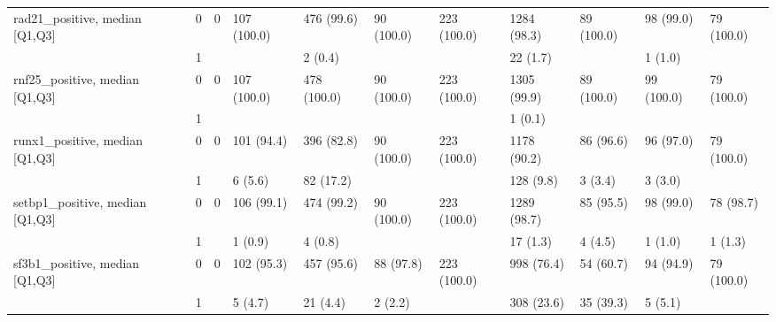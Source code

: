\begin{tabular}{lllllllllll}
rad21\_positive, median [Q1,Q3] & 0 &                    0 &         107 (100.0) &         476 (99.6) &           90 (100.0) &         223 (100.0) &       1284 (98.3) &        89 (100.0) &           98 (99.0) &           79 (100.0) \\
                 & 1 &                      &                     &            2 (0.4) &                      &                     &          22 (1.7) &                   &             1 (1.0) &                      \\
rnf25\_positive, median [Q1,Q3] & 0 &                    0 &         107 (100.0) &        478 (100.0) &           90 (100.0) &         223 (100.0) &       1305 (99.9) &        89 (100.0) &          99 (100.0) &           79 (100.0) \\
                 & 1 &                      &                     &                    &                      &                     &           1 (0.1) &                   &                     &                      \\
runx1\_positive, median [Q1,Q3] & 0 &                    0 &          101 (94.4) &         396 (82.8) &           90 (100.0) &         223 (100.0) &       1178 (90.2) &         86 (96.6) &           96 (97.0) &           79 (100.0) \\
                 & 1 &                      &             6 (5.6) &          82 (17.2) &                      &                     &         128 (9.8) &           3 (3.4) &             3 (3.0) &                      \\
setbp1\_positive, median [Q1,Q3] & 0 &                    0 &          106 (99.1) &         474 (99.2) &           90 (100.0) &         223 (100.0) &       1289 (98.7) &         85 (95.5) &           98 (99.0) &            78 (98.7) \\
                 & 1 &                      &             1 (0.9) &            4 (0.8) &                      &                     &          17 (1.3) &           4 (4.5) &             1 (1.0) &              1 (1.3) \\
sf3b1\_positive, median [Q1,Q3] & 0 &                    0 &          102 (95.3) &         457 (95.6) &            88 (97.8) &         223 (100.0) &        998 (76.4) &         54 (60.7) &           94 (94.9) &           79 (100.0) \\
                 & 1 &                      &             5 (4.7) &           21 (4.4) &              2 (2.2) &                     &        308 (23.6) &         35 (39.3) &             5 (5.1) &                      \\

\end{tabular}
